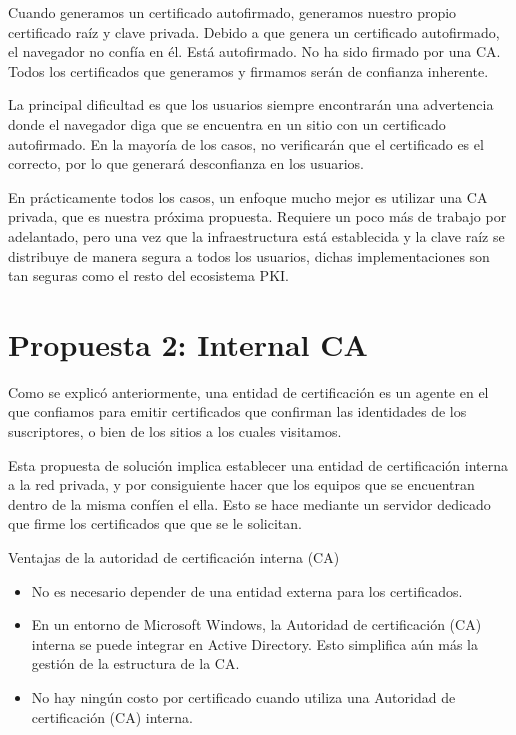 Cuando generamos un certificado autofirmado, generamos nuestro propio certificado 
raíz y clave privada. Debido a que genera un certificado autofirmado, el navegador 
no confía en él. Está autofirmado. No ha sido firmado por una CA. Todos los 
certificados que generamos y firmamos serán de confianza inherente.

La principal dificultad es que los usuarios siempre encontrarán una advertencia 
donde el navegador diga que se encuentra en un sitio con un certificado autofirmado. 
En la mayoría de los casos, no verificarán que el certificado es el correcto, por 
lo que generará desconfianza en los usuarios.

En prácticamente todos los casos, un enfoque mucho mejor es utilizar una CA privada, 
que es nuestra próxima propuesta. Requiere un poco más de trabajo por adelantado, 
pero una vez que la infraestructura está establecida y la clave raíz se distribuye 
de manera segura a todos los usuarios, dichas implementaciones son tan seguras como 
el resto del ecosistema PKI.

\section{Propuesta 2: Internal CA}

Como se explicó anteriormente, una entidad de certificación es un agente en el que 
confiamos para emitir 
certificados que confirman las identidades de los suscriptores, o bien de los 
sitios a los cuales visitamos. 

Esta propuesta de solución implica establecer una entidad de certificación interna 
a la red privada, y por consiguiente hacer que los equipos que se encuentran 
dentro de la misma confíen el ella. Esto se hace 
mediante un servidor dedicado que firme los certificados que que se le solicitan.

Ventajas de la autoridad de certificación interna (CA)
\begin{itemize}
   \setlength\itemsep{-0.6em}
   \item No es necesario depender de una entidad externa para los certificados.
   \item En un entorno de Microsoft Windows, la Autoridad de certificación (CA) interna se puede 
   integrar en Active Directory. Esto simplifica aún más la gestión de la estructura de la CA.
   \item No hay ningún costo por certificado cuando utiliza una Autoridad de certificación (CA) 
   interna.
\end{itemize}

